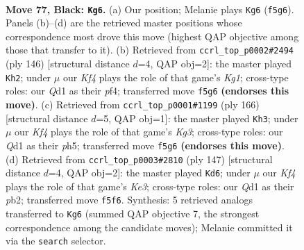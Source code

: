 \documentclass[11pt]{article}
\begin{document}
\clearpage

\begin{figure}[p]\centering
\begin{subfigure}{0.46\textwidth}\centering
\resizebox{\linewidth}{!}{%
\newchessgame
\chessboard[
  setfen={8/8/1p6/p4k2/2P5/8/K7/3q4 b - - 11 77},
  showmover=false,
  pgfstyle=straightmove, color=movearrow, markmove={f5-g6}
]}
\caption{}
\end{subfigure}\hfill
\begin{subfigure}{0.46\textwidth}\centering
\resizebox{\linewidth}{!}{%
\newchessgame
\chessboard[
  setfen={8/8/8/3k2Pp/5p1P/8/8/6K1 w - - 12 74},
  showmover=false,
  pgfstyle=straightmove, color=movearrow, markmove={g1-h2}
]}
\caption{}
\end{subfigure}
\\[4pt]
\begin{subfigure}{0.46\textwidth}\centering
\resizebox{\linewidth}{!}{%
\newchessgame
\chessboard[
  setfen={6k1/8/8/p6p/2P5/1P4K1/8/8 w - - 15 84},
  showmover=false,
  pgfstyle=straightmove, color=movearrow, markmove={g3-h3}
]}
\caption{}
\end{subfigure}\hfill
\begin{subfigure}{0.46\textwidth}\centering
\resizebox{\linewidth}{!}{%
\newchessgame
\chessboard[
  setfen={8/6p1/4k1Pp/8/4K3/8/1P6/8 b - - 0 74},
  showmover=false,
  pgfstyle=straightmove, color=movearrow, markmove={e6-d6}
]}
\caption{}
\end{subfigure}
\caption{\textbf{Move 77, Black: \texttt{Kg6}.} (a) Our position; Melanie plays \texttt{Kg6} (\texttt{f5g6}). Panels (b)--(d) are the retrieved master positions whose correspondence most drove this move (highest QAP objective among those that transfer to it). (b) Retrieved from \texttt{ccrl\_top\_p0002\#2494} (ply 146) [structural distance $d$=4, QAP obj=2]: the master played \texttt{Kh2}; under $\mu$ our \emph{Kf4} plays the role of that game's \emph{Kg1}; cross-type roles: our \emph{Q}d1 as their \emph{p}f4; transferred move \texttt{f5g6} \textbf{(endorses this move)}. (c) Retrieved from \texttt{ccrl\_top\_p0001\#1199} (ply 166) [structural distance $d$=5, QAP obj=1]: the master played \texttt{Kh3}; under $\mu$ our \emph{Kf4} plays the role of that game's \emph{Kg3}; cross-type roles: our \emph{Q}d1 as their \emph{p}h5; transferred move \texttt{f5g6} \textbf{(endorses this move)}. (d) Retrieved from \texttt{ccrl\_top\_p0003\#2810} (ply 147) [structural distance $d$=4, QAP obj=2]: the master played \texttt{Kd6}; under $\mu$ our \emph{Kf4} plays the role of that game's \emph{Ke3}; cross-type roles: our \emph{Q}d1 as their \emph{p}b2; transferred move \texttt{f5f6}. Synthesis: 5 retrieved analogs transferred to \texttt{Kg6} (summed QAP objective 7, the strongest correspondence among the candidate moves); Melanie committed it via the \texttt{search} selector.}
\label{fig:thought-m153}
\end{figure}
\end{document}
